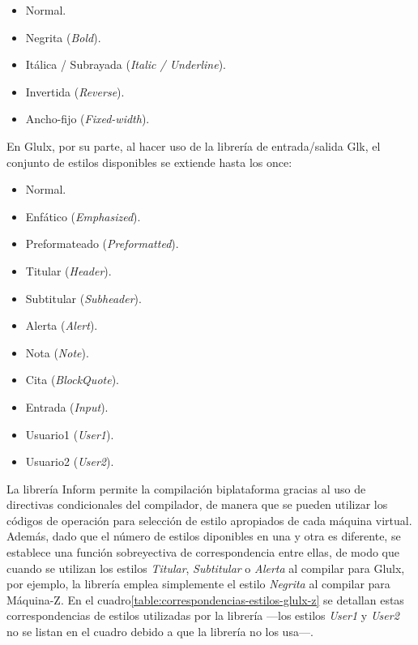 \documentclass[a4paper,12pt]{article}
\numberwithin{equation}{section}
\begin{document}
\begin{itemize}
	\item Normal.
	\item Negrita (\emph{Bold}).
	\item Itálica / Subrayada (\emph{Italic / Underline}).
	\item Invertida (\emph{Reverse}).
	\item Ancho-fijo (\emph{Fixed-width}).
\end{itemize}

En Glulx, por su parte, al hacer uso de la librería de entrada/salida Glk, el conjunto de estilos disponibles se extiende hasta los once\cite{PLO17}:

\begin{itemize}
	\item Normal.
	\item Enfático (\emph{Emphasized}).
	\item Preformateado (\emph{Preformatted}).
	\item Titular (\emph{Header}).
	\item Subtitular (\emph{Subheader}).
	\item Alerta (\emph{Alert}).
	\item Nota (\emph{Note}).
	\item Cita (\emph{BlockQuote}).
	\item Entrada (\emph{Input}).
	\item Usuario1 (\emph{User1}).
	\item Usuario2 (\emph{User2}).
\end{itemize}

La librería Inform permite la compilación biplataforma gracias al uso de directivas condicionales del compilador, de manera que se pueden utilizar los códigos de operación para selección de estilo apropiados de cada máquina virtual. Además, dado que el número de estilos diponibles en una y otra es diferente, se establece una función sobreyectiva de correspondencia entre ellas, de modo que cuando se utilizan los estilos \emph{Titular}, \emph{Subtitular} o \emph{Alerta} al compilar para Glulx, por ejemplo, la librería emplea simplemente el estilo \emph{Negrita} al compilar para Máquina-Z. En el cuadro\ref{table:correspondencias-estilos-glulx-z} se detallan estas correspondencias de estilos utilizadas por la librería ---los estilos \emph{User1} y \emph{User2} no se listan en el cuadro debido a que la librería no los usa---.
\end{document}
